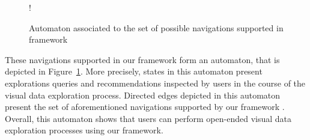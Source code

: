 \begin{figure}[t]
 \begin{center}
 \resizebox {0.6\textwidth} {!} 
	{
                   }    
\caption{Automaton associated to the set of possible navigations supported in \framework{} framework}
\label{fig:automata}
\end{center}
\end{figure} 
  			
  These navigations supported in our framework \framework{} form an automaton, that is depicted in Figure~\ref{fig:automata}. 
  More precisely, states in this automaton present explorations queries and recommendations inspected by users in the course of the visual data exploration process.
Directed edges depicted in this automaton present the set of aforementioned navigations supported by our framework \framework{}. Overall, this automaton shows that users can perform open-ended visual data exploration processes using our framework.
